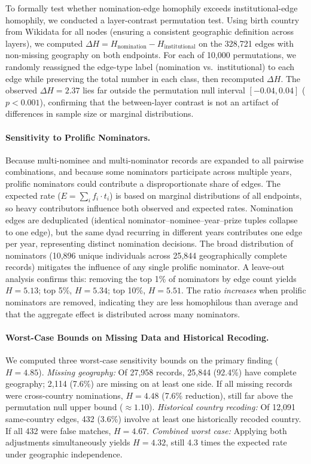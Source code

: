 \documentclass[12pt]{article}
\begin{document}
To formally test whether nomination-edge homophily exceeds institutional-edge homophily, we conducted a layer-contrast permutation test. Using birth country from Wikidata for all nodes (ensuring a consistent geographic definition across layers), we computed $\Delta H = H_{\text{nomination}} - H_{\text{institutional}}$ on the 328,721 edges with non-missing geography on both endpoints. For each of 10,000 permutations, we randomly reassigned the edge-type label (nomination vs.\ institutional) to each edge while preserving the total number in each class, then recomputed $\Delta H$. The observed $\Delta H = 2.37$ lies far outside the permutation null interval $[-0.04, 0.04]$ ($p < 0.001$), confirming that the between-layer contrast is not an artifact of differences in sample size or marginal distributions.

\paragraph*{Sensitivity to Prolific Nominators.}

Because multi-nominee and multi-nominator records are expanded to all pairwise combinations, and because some nominators participate across multiple years, prolific nominators could contribute a disproportionate share of edges. The expected rate ($E = \sum_i f_i \cdot t_i$) is based on marginal distributions of all endpoints, so heavy contributors influence both observed and expected rates. Nomination edges are deduplicated (identical nominator--nominee--year--prize tuples collapse to one edge), but the same dyad recurring in different years contributes one edge per year, representing distinct nomination decisions. The broad distribution of nominators (10,896 unique individuals across 25,844 geographically complete records) mitigates the influence of any single prolific nominator. A leave-out analysis confirms this: removing the top 1\% of nominators by edge count yields $H = 5.13$; top 5\%, $H = 5.34$; top 10\%, $H = 5.51$. The ratio \emph{increases} when prolific nominators are removed, indicating they are less homophilous than average and that the aggregate effect is distributed across many nominators.

\paragraph*{Worst-Case Bounds on Missing Data and Historical Recoding.}

We computed three worst-case sensitivity bounds on the primary finding ($H = 4.85$). \emph{Missing geography:} Of 27,958 records, 25,844 (92.4\%) have complete geography; 2,114 (7.6\%) are missing on at least one side. If all missing records were cross-country nominations, $H = 4.48$ (7.6\% reduction), still far above the permutation null upper bound ($\approx 1.10$). \emph{Historical country recoding:} Of 12,091 same-country edges, 432 (3.6\%) involve at least one historically recoded country. If all 432 were false matches, $H = 4.67$. \emph{Combined worst case:} Applying both adjustments simultaneously yields $H = 4.32$, still 4.3 times the expected rate under geographic independence.
\end{document}
